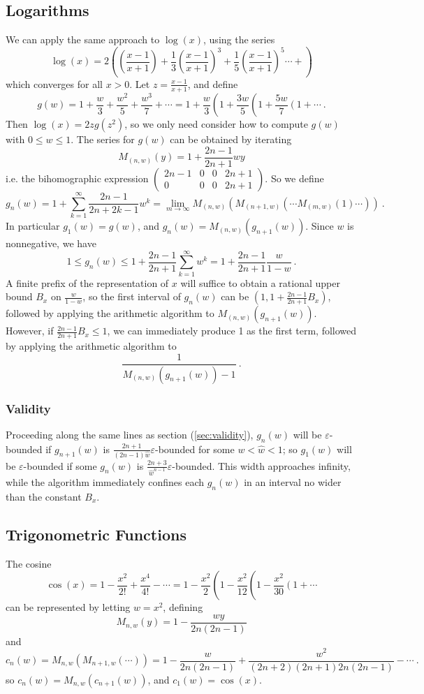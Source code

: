 \documentclass[11pt, oneside]{amsart}   	%
\newcommand{\bihomographic}[8]{\left(\begin{smallmatrix}#1&#2&#3&#4\\#5&#6&#7&#8\end{smallmatrix}\right)}
\renewcommand{\:}{\negthickspace:\negthickspace}
\begin{document}
\subsection{Logarithms} We can apply the same approach to $\log(x)$, using the series
\[
\log (x) =  2 \left( \left(\frac{x-1}{x+1}\right) + \frac{1}{3}\left(\frac{x-1}{x+1}\right)^3 + \frac{1}{5}\left(\frac{x-1}{x+1}\right)^5 \cdots + \right)
\]
which converges for all $x > 0$. Let $z=\frac{x-1}{x+1}$, and define
\[
g(w) = 1 + \frac{w}{3} + \frac{w^2}{5} + \frac{w^3}{7} + \cdots = 1 + \frac{w}{3}\left(1 + \frac{3w}{5}\left(1 + \frac{5w}{7}\left(1 +\cdots \right. \right. \right.\ .
\]
Then $\log(x) = 2zg(z^2)$, so we only need consider how to compute $g(w)$ with $0 \leq w \leq 1$.
The series for $g(w)$ can be obtained by iterating
\[
M_{(n,w)}(y) = 1 + \frac{2n-1}{2n+1}wy 
\]
i.e. the bihomographic expression $\bihomographic{2n-1}{0}{0}{2n+1}{0}{0}{0}{2n+1}$.
So we define
\[
g_n(w) = 1  + \sum_{k=1}^{\infty}\frac{2n-1}{2n+2k-1}w^k= \lim_{m\to\infty} M_{(n,w)}( M_{(n+1,w)}( \cdots M_{(m,w)}(1) \cdots ) ) \ .
\]
In particular $g_1(w) = g(w)$, and $g_n(w) = M_{(n,w)}(g_{n+1}(w))$. Since $w$ is nonnegative, we have
\begin{equation}\label{eq:logbound}
1 \leq g_n(w) \leq 1 + \frac{2n-1}{2n+1}\sum_{k=1}^{\infty} w^k = 1+\frac{2n-1}{2n+1}\frac{w}{1-w}\ .
\end{equation}
A finite prefix of the representation of $x$ will suffice to obtain a rational upper bound $B_x$ on $\frac{w}{1-w}$, so the first interval of $g_n(w)$ can be $(1, 1+\frac{2n-1}{2n+1}B_x)$, followed by applying the arithmetic algorithm to $M_{(n,w)}(g_{n+1}(w))$. However, if $\frac{2n-1}{2n+1}B_x \leq 1$, we can immediately produce 1 as the first term, followed by applying the
arithmetic algorithm to
\[
\frac{1}{M_{(n,w)}(g_{n+1}(w)) - 1}\ .
\]

\subsubsection{Validity} Proceeding along the same lines as section (\ref{sec:validity}), $g_n(w)$ will be $\varepsilon$-bounded if
$g_{n+1}(w)$ is $\frac{2n+1}{(2n-1)\hat{w}}\varepsilon$-bounded for some $w < \hat{w} < 1$; so $g_1(w)$ will be $\varepsilon$-bounded if some $g_n(w)$ is
$\frac{2n+3}{\hat{w}^{n-1}}\varepsilon$-bounded. This width approaches infinity,
while the algorithm immediately confines each $g_n(w)$ in an interval no wider than the constant $B_x$.


\subsection{Trigonometric Functions}
The cosine
\[
\cos(x) = 1 - \frac{x^2}{2!} + \frac{x^4}{4!} - \cdots = 1 - \frac{x^2}{2} \left(1 - \frac{x^2}{12}\left( 1 - \frac{x^2}{30}\left(1 + \cdots \right. \right.  \right.  
\]
can be represented by letting $w=x^2$, defining
\[
M_{n,w}(y) = 1 - \frac{wy}{2n(2n-1)}
\]
and
\begin{equation}\label{eq:cosIter}
c_n(w) = M_{n,w}(M_{n+1,w}(\cdots)) = 1 - \frac{w}{2n(2n-1)} + \frac{w^2}{(2n+2)(2n+1)2n(2n-1)} - \cdots \ .
\end{equation}
so $c_n(w) = M_{n,w}(c_{n+1}(w))$, and $c_1(w) = \cos(x)$.
\end{document}
